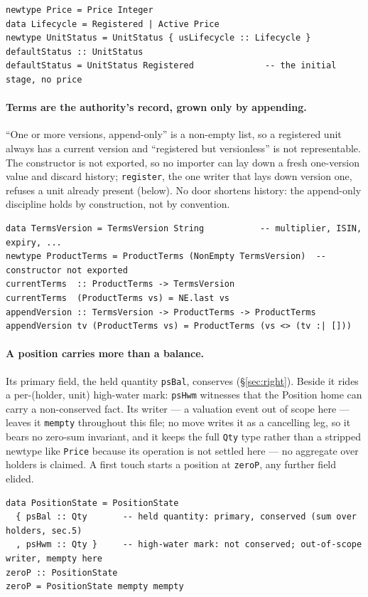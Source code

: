 \documentclass[11pt,a4paper]{article}
\begin{document}
\begin{lstlisting}
newtype Price = Price Integer
data Lifecycle = Registered | Active Price
newtype UnitStatus = UnitStatus { usLifecycle :: Lifecycle }
defaultStatus :: UnitStatus
defaultStatus = UnitStatus Registered              -- the initial stage, no price
\end{lstlisting}

\paragraph{Terms are the authority's record, grown only by appending.}
``One or more
versions, append-only'' is a non-empty list, so a registered unit always has a
current version and ``registered but versionless'' is not representable. The
constructor is not exported, so no importer can lay down a fresh one-version value
and discard history; \texttt{register}, the one writer that lays down version one,
refuses a unit already present (below). No door shortens history: the
append-only discipline holds by construction, not by convention.

\begin{lstlisting}
data TermsVersion = TermsVersion String           -- multiplier, ISIN, expiry, ...
newtype ProductTerms = ProductTerms (NonEmpty TermsVersion)  -- constructor not exported
currentTerms  :: ProductTerms -> TermsVersion
currentTerms  (ProductTerms vs) = NE.last vs
appendVersion :: TermsVersion -> ProductTerms -> ProductTerms
appendVersion tv (ProductTerms vs) = ProductTerms (vs <> (tv :| []))
\end{lstlisting}

\paragraph{A position carries more than a balance.}
Its primary field, the held quantity \texttt{psBal}, conserves (\S\ref{sec:right}).
Beside it rides a per-(holder, unit) high-water mark: \texttt{psHwm} witnesses that the
Position home can carry a non-conserved fact. Its writer --- a valuation event out of
scope here --- leaves it \texttt{mempty} throughout this file; no move writes it as a
cancelling leg, so it bears no zero-sum invariant, and it keeps the full \texttt{Qty}
type rather than a stripped newtype like \texttt{Price} because its operation is not
settled here --- no aggregate over holders is claimed. A first touch starts a position at
\texttt{zeroP}, any further field elided.

\begin{lstlisting}
data PositionState = PositionState
  { psBal :: Qty       -- held quantity: primary, conserved (sum over holders, sec.5)
  , psHwm :: Qty }     -- high-water mark: not conserved; out-of-scope writer, mempty here
zeroP :: PositionState
zeroP = PositionState mempty mempty
\end{lstlisting}
\end{document}
